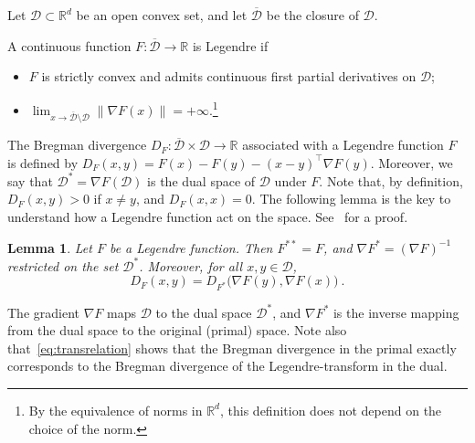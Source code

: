 \documentclass[11pt]{hackednow}
\newtheorem{lemma}{Lemma}[chapter]
\newcommand{\R}{\mathbb{R}}
\newcommand{\cD}{\mathcal{D}}
\newcommand{\oD}{\overline{\mathcal{D}}}
\newcommand{\norm}[1]{\left\|{#1}\right\|}
\begin{document}
Let $\cD \subset \R^d$ be an open convex set, and let $\oD$ be the closure of $\cD$. 
\begin{definition}
A continuous function $F:\oD\to\R$ is Legendre if 
\begin{itemize}
\item[(i)] $F$ is strictly convex and admits continuous first partial
derivatives on $\cD$;
\item[(ii)] ${\displaystyle \lim_{x \to \oD \setminus \cD} \norm{\nabla F(x)} = +\infty.}$\footnote{By the equivalence of norms in $\R^d$, this definition does not depend on the choice of the norm.}
\end{itemize}
\end{definition}
%
The Bregman divergence $D_F: \oD\times\cD \to \R$ associated with a Legendre function $F$ is defined by
  $
  D_F(x,y) = F(x) - F(y) - (x-y)^{\top} \nabla F(y)
  $. 
Moreover, we say that $\cD^* = \nabla F (\cD)$ is the dual space of $\cD$ under $F$.
Note that, by definition, $D_F(x,y) > 0$ if $x \neq y$, and $D_F(x,x)=0$. The following lemma is the key to understand how a Legendre function act on the space. See~\cite[Proposition~11.1]{CL06} for a proof.
%
\begin{lemma}
Let $F$ be a Legendre function. Then $F^{**} = F$, and $\nabla F^* = (\nabla F)^{-1}$ restricted on the set $\cD^*$. Moreover, for all $x, y \in \cD$,
\begin{equation} \label{eq:transrelation}
D_F(x,y) = D_{F^*}\bigl(\nabla F(y), \nabla F(x)\bigr)~.
\end{equation}
\end{lemma}
The gradient $\nabla F$ maps $\cD$ to the dual space $\cD^*$, and $\nabla F^*$ is the inverse mapping from the dual space to the original (primal) space. Note also that~\eqref{eq:transrelation} shows that the Bregman divergence in the primal exactly corresponds to the Bregman divergence of the Legendre-transform in the dual.
\end{document}
